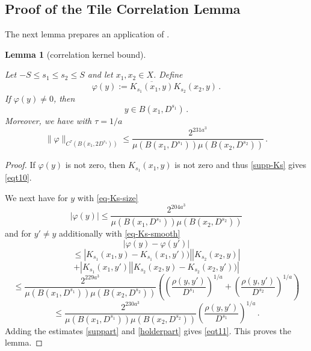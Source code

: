 \documentclass[10pt,a4paper]{article}
\theoremstyle{plain}
\newtheorem{lemma}[theorem]{Lemma}
\theoremstyle{definition}
\numberwithin{equation}{subsection}
\newcommand{\lean}[1]{}
\newcommand{\leanok}{}
\begin{document}
\subsection{Proof of the Tile Correlation Lemma}\label{sec-tile-operator}

The next lemma prepares an application of
.
\begin{lemma}[correlation kernel bound]\label{correlation-kernel-bound}
\leanok
\lean{Tile.correlation, Tile.mem_ball_of_correlation_ne_zero, Tile.correlation_kernel_bound}
Let $-S\le s_1\le s_2\le S$ and let $x_1,x_2\in X$.
Define \begin{equation}
 \varphi(y) := \overline{K_{s_1}(x_1, y)}
 K_{s_2}(x_2, y) \, .
\end{equation}
If $\varphi(y)\neq 0$, then
\begin{equation}\label{eqt10}
    y\in B(x_1, D^{s_1})\, .
\end{equation}
Moreover, we have with $\tau = 1/a$
\begin{equation}\label{eqt11}
  \|\varphi\|_{C^\tau(B(x_1, 2 D^{s_1}))}\le
\frac{2^{231 a^3}}{\mu(B(x_1, D^{s_1}))\mu(B(x_2, D^{s_2}))}
      \, .
\end{equation}

\end{lemma}
\begin{proof}
\leanok

If $\varphi(y)$ is not zero, then $K_{s_1}(x_1, y)$ is not zero and thus
\eqref{supp-Ks} gives \eqref{eqt10}.

We next have for $y$ with \eqref{eq-Ks-size}
\begin{equation}\label{suppart}
    |\varphi(y)|\le
    \frac{2^{204 a^3}}{\mu(B(x_1, D^{s_1}))\mu(B(x_2, D^{s_2}))}
\end{equation}
and for $y'\neq y$ additionally with \eqref{eq-Ks-smooth}
\begin{equation}
    |\varphi(y)-\varphi(y')|
 \end{equation}
 \begin{equation}
 \le
 |K_{s_1}(x_1,y)-K_{s_1}(x_1,y'))||
 K_{s_2}(x_2, y)|
\end{equation}
 \begin{equation}+|K_{s_1}(x_1, y')|
 |K_{s_2}(x_2, y) - K_{s_2}(x_2, y'))|
\end{equation}
\begin{equation}
      \le \frac{2^{229 a^3}}{\mu(B(x_1, D^{s_1}))\mu(B(x_2, D^{s_2}))}
       \left(\left(\frac{ \rho(y,y')}{D^{s_1}}\right)^{1/a}+
       \left(\frac{ \rho(y,y')}{D^{s_2}}\right)^{1/a}\right)
\end{equation}
\begin{equation}\label{holderpart}
      \le \frac{2^{230 a^3}}{\mu(B(x_1, D^{s_1}))\mu(B(x_2, D^{s_2}))}
       \left(\frac{ \rho(y,y')}{D^{s_1}}\right)^{1/a}\,.
\end{equation}
Adding the estimates \eqref{suppart} and \eqref{holderpart} gives \eqref{eqt11}.
This proves the lemma.
\end{proof}
\end{document}
